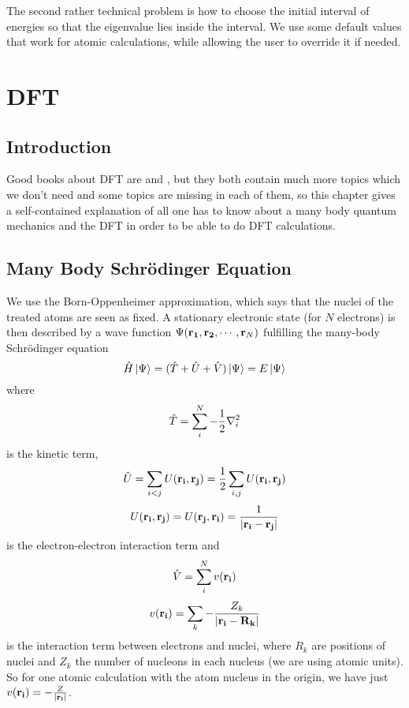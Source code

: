 The second rather technical problem is how to choose the initial interval of energies so that the eigenvalue lies inside the interval. We use some default values that work for atomic calculations, while allowing the user to override it if needed.

\section{DFT}

\subsection{Introduction}

Good books about DFT are \cite{DFT} and \cite{martin}, but they both contain much more topics which we don't need and some topics are missing in each of them, so this chapter gives a self-contained explanation of all one has to know about a many body quantum mechanics and the DFT in order to be able to do DFT calculations.

\subsection{Many Body Schrödinger Equation}

We use the Born-Oppenheimer approximation, which says that the nuclei of the treated atoms are seen as fixed. A stationary electronic state (for $N$ electrons) is then described by a wave function $\Psi({\bf r_1},{\bf r_2},\cdots,{\bf r}_N)$ fulfilling the many-body Schrödinger equation 
\begin{equation*}
  \hat H\mathinner{|{\Psi}\rangle}=(\hat T+\hat U+\hat V)\mathinner{|{\Psi}\rangle}=E\mathinner{|{\Psi}\rangle}
\end{equation*}
where 
\begin{equation*}
  \hat T = \sum_i^N -{1\over2}\nabla_i^2
\end{equation*}
is the kinetic term, 
\begin{equation*}
  \hat U = \sum_{i<j}U({\bf r_i},{\bf r_j})= {1\over2}\sum_{i,j}U({\bf r_i},{\bf r_j})
\end{equation*}
\begin{equation*}
  U({\bf r_i},{\bf r_j})=U({\bf r_j},{\bf r_i})={1\over|{\bf r_i}-{\bf r_j}|}
\end{equation*}
is the electron-electron interaction term and 
\begin{equation*}
  \hat V = \sum_i^N v({\bf r_i})
\end{equation*}
\begin{equation*}
  v({\bf r_i})=\sum_k -{Z_k\over|{\bf r_i}-{\bf R_k}|}
\end{equation*}
is the interaction term between electrons and nuclei, where $R_k$ are positions of nuclei and $Z_k$ the number of nucleons in each nucleus (we are using atomic units). So for one atomic calculation with the atom nucleus in the origin, we have just $v({\bf r_i})=-{Z\over|{\bf r_i}|}$.

